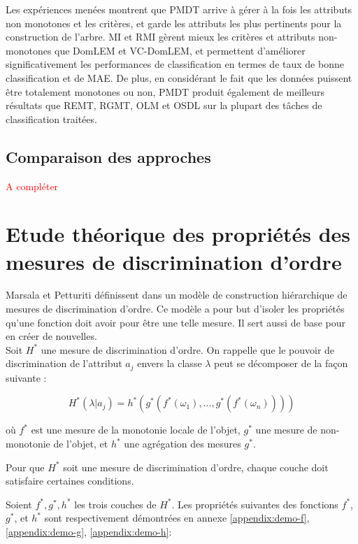 \documentclass[a4paper]{article}
\begin{document}
Les expériences menées montrent que PMDT arrive à gérer à la fois les attributs
non monotones et les critères, et garde les attributs les plus pertinents pour
la construction de l'arbre. MI et RMI gèrent mieux les critères et attributs
non-monotones que DomLEM et VC-DomLEM, et permettent d'améliorer
significativement les performances de classification en termes de taux de bonne
classification et de MAE. De plus, en considérant le fait que les données
puissent être totalement monotones ou non, PMDT produit également de meilleurs
résultats que REMT, RGMT, OLM et OSDL sur la plupart des tâches de
classification traitées.

\subsection{Comparaison des approches}

\textcolor{red}{A compléter} %


\section{Etude théorique des propriétés des mesures de discrimination d'ordre}
Marsala et Petturiti définissent dans \cite{marsala-rank} un modèle de
construction hiérarchique de mesures de discrimination d'ordre. Ce modèle a pour
but d'isoler les propriétés qu'une fonction doit avoir pour être une telle
mesure. Il sert aussi de base pour en créer de nouvelles. \\

Soit $H^*$ une mesure de discrimination d'ordre. On rappelle que le pouvoir de
discrimination de l'attribut $a_j$ envers la classe $\lambda$ peut se décomposer
de la façon suivante :

$$ H^*(\lambda|a_j) = h^*(g^*(f^*(\omega_1),...,g^*(f^*(\omega_n))))$$

où $f^*$ est une mesure de la monotonie locale de l'objet, $g^*$ une mesure
de non-monotonie de l'objet, et $h^*$ une agrégation des mesures $g^*$.

Pour que $H^*$ soit une mesure de discrimination d'ordre, chaque couche doit
satisfaire certaines conditions.

Soient $f^*, g^*, h^*$ les trois couches de $H^*$. Les propriétés suivantes des
fonctions $f^*$, $g^*$, et $h^*$ sont respectivement démontrées en annexe
\ref{appendix:demo-f}, \ref{appendix:demo-g}, \ref{appendix:demo-h}:
\end{document}
